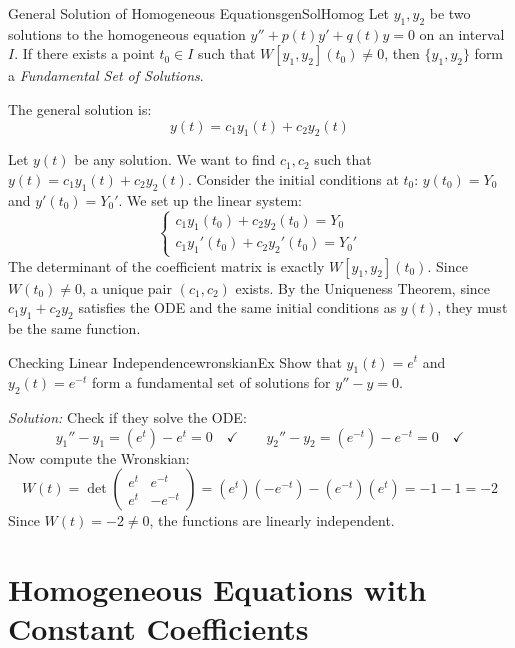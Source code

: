 \documentclass{book}
\newenvironment{Proof}[1][]
  {\begin{ProofTcb}[#1]}
  {\end{ProofTcb}}
\begin{document}
\begin{thm}{General Solution of Homogeneous Equations}{genSolHomog}
    Let $y_1, y_2$ be two solutions to the homogeneous equation $y'' + p(t)y' + q(t)y = 0$ on an interval $I$. If there exists a point $t_0 \in I$ such that $W[y_1, y_2](t_0) \ne 0$, then $\{y_1, y_2\}$ form a \emph{Fundamental Set of Solutions}.

    The general solution is:
    \[
        y(t) = c_1 y_1(t) + c_2 y_2(t)
    \]
\end{thm}

\begin{Proof}
    Let $y(t)$ be any solution. We want to find $c_1, c_2$ such that $y(t) = c_1 y_1(t) + c_2 y_2(t)$. Consider the initial conditions at $t_0$: $y(t_0) = Y_0$ and $y'(t_0) = Y_0'$. We set up the linear system:
    \[
        \begin{cases}
            c_1 y_1(t_0) + c_2 y_2(t_0) = Y_0 \\
            c_1 y_1'(t_0) + c_2 y_2'(t_0) = Y_0'
        \end{cases}
    \]
    The determinant of the coefficient matrix is exactly $W[y_1, y_2](t_0)$. Since $W(t_0) \ne 0$, a unique pair $(c_1, c_2)$ exists. By the Uniqueness Theorem, since $c_1 y_1 + c_2 y_2$ satisfies the ODE and the same initial conditions as $y(t)$, they must be the same function.
\end{Proof}

\begin{example}{Checking Linear Independence}{wronskianEx}
    Show that $y_1(t) = e^t$ and $y_2(t) = e^{-t}$ form a fundamental set of solutions for $y'' - y = 0$.

    \emph{Solution:}
    Check if they solve the ODE:
    \[
        y_1'' - y_1 = (e^t) - e^t = 0 \quad \checkmark \qquad y_2'' - y_2 = (e^{-t}) - e^{-t} = 0 \quad \checkmark
    \]
    Now compute the Wronskian:
    \[
        W(t) = \det \begin{pmatrix} e^t & e^{-t} \\ e^t & -e^{-t} \end{pmatrix} = (e^t)(-e^{-t}) - (e^{-t})(e^t) = -1 - 1 = -2
    \]
    Since $W(t) = -2 \ne 0$, the functions are linearly independent.
\end{example}

\section{Homogeneous Equations with Constant Coefficients}
\end{document}
